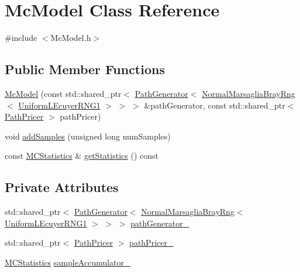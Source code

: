 \hypertarget{class_mc_model}{}\section{Mc\+Model Class Reference}
\label{class_mc_model}


{\ttfamily \#include $<$Mc\+Model.\+h$>$}

\subsection*{Public Member Functions}
\begin{DoxyCompactItemize}
\item 
\hyperlink{class_mc_model_ac8cfd885b4baeabe5c20ad56ce1803f0}{Mc\+Model} (const std\+::shared\+\_\+ptr$<$ \hyperlink{class_path_generator}{Path\+Generator}$<$ \hyperlink{class_normal_marsaglia_bray_rng}{Normal\+Marsaglia\+Bray\+Rng}$<$ \hyperlink{class_uniform_l_ecuyer_r_n_g1}{Uniform\+L\+Ecuyer\+R\+N\+G1} $>$ $>$ $>$ \&path\+Generator, const std\+::shared\+\_\+ptr$<$ \hyperlink{class_path_pricer}{Path\+Pricer} $>$ path\+Pricer)
\item 
void \hyperlink{class_mc_model_a81f56ed90c002927bdec595eb52c57c3}{add\+Samples} (unsigned long num\+Samples)
\item 
const \hyperlink{class_m_c_statistics}{M\+C\+Statistics} \& \hyperlink{class_mc_model_afc977c490efd468506d7436901a72177}{get\+Statistics} () const
\end{DoxyCompactItemize}
\subsection*{Private Attributes}
\begin{DoxyCompactItemize}
\item 
std\+::shared\+\_\+ptr$<$ \hyperlink{class_path_generator}{Path\+Generator}$<$ \hyperlink{class_normal_marsaglia_bray_rng}{Normal\+Marsaglia\+Bray\+Rng}$<$ \hyperlink{class_uniform_l_ecuyer_r_n_g1}{Uniform\+L\+Ecuyer\+R\+N\+G1} $>$ $>$ $>$ \hyperlink{class_mc_model_a169810bfa106409ed8bcdba1a5097997}{path\+Generator\+\_\+}
\item 
std\+::shared\+\_\+ptr$<$ \hyperlink{class_path_pricer}{Path\+Pricer} $>$ \hyperlink{class_mc_model_a8b4390b3abdd1ffdd121a09f141299f9}{path\+Pricer\+\_\+}
\item 
\hyperlink{class_m_c_statistics}{M\+C\+Statistics} \hyperlink{class_mc_model_aec19a3ee01c95751a50360d264d51def}{sample\+Accumulator\+\_\+}
\end{DoxyCompactItemize}


